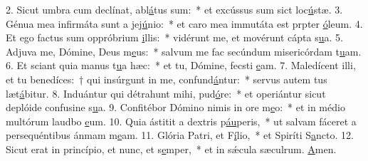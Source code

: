2. Sicut umbra cum declínat, abl\uline{á}tus sum:~* et excússus sum sict loc\uline{ú}stæ.
3. Génua mea infirmáta sunt a jej\uline{ú}nio:~* et caro mea immutáta est prpter \uline{ó}leum.
4. Et ego factus sum oppróbrium \uline{i}llis:~* vidérunt me, et movérunt cápta s\uline{u}a.
5. Adjuva me, Dómine, Deus m\uline{e}us:~* salvum me fac secúndum misericórdam t\uline{u}am.
6. Et sciant quia manus t\uline{u}a hæc:~* et tu, Dómine, fecsti \uline{e}am.
7. Maledícent illi, et tu benedíces:~† qui insúrgunt in me, confund\uline{á}ntur:~* servus autem tus læt\uline{á}bitur.
8. Induántur qui détrahunt mihi, pud\uline{ó}re:~* et operiántur sicut deplóide confusine s\uline{u}a.
9. Confitébor Dómino nimis in ore m\uline{e}o:~* et in médio multórum laudbo \uline{e}um.
10. Quia ástitit a dextris p\uline{áu}peris,~* ut salvam fáceret a persequéntibus ánmam m\uline{e}am.
11. Glória Patri, et F\uline{í}lio,~* et Spiríti S\uline{a}ncto.
12. Sicut erat in princípio, et nunc, et s\uline{e}mper,~* et in sǽcula sæculrum. \uline{A}men.

